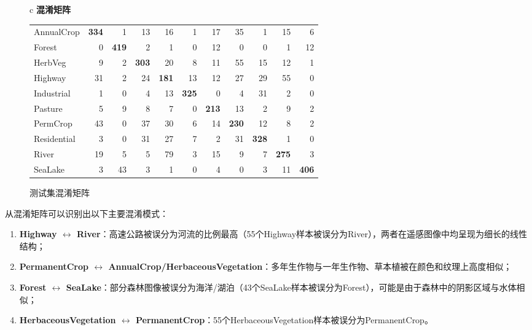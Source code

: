 \documentclass[12pt,a4paper]{article}
\begin{document}
\begin{figure}[H]
\centering
\begin{tabular}{c}
\toprule
\textbf{混淆矩阵} \\
\midrule
\small
\begin{tabular}{l*{10}{r}}
 & \rotatebox{70}{AnnualCrop} & \rotatebox{70}{Forest} & \rotatebox{70}{HerbVeg} & \rotatebox{70}{Highway} & \rotatebox{70}{Industrial} & \rotatebox{70}{Pasture} & \rotatebox{70}{PermCrop} & \rotatebox{70}{Residential} & \rotatebox{70}{River} & \rotatebox{70}{SeaLake} \\
\midrule
AnnualCrop & \textbf{334} & 1 & 13 & 16 & 1 & 17 & 35 & 1 & 15 & 6 \\
Forest & 0 & \textbf{419} & 2 & 1 & 0 & 12 & 0 & 0 & 1 & 12 \\
HerbVeg & 9 & 2 & \textbf{303} & 20 & 8 & 11 & 55 & 15 & 12 & 1 \\
Highway & 31 & 2 & 24 & \textbf{181} & 13 & 12 & 27 & 29 & 55 & 0 \\
Industrial & 1 & 0 & 4 & 13 & \textbf{325} & 0 & 4 & 31 & 2 & 0 \\
Pasture & 5 & 9 & 8 & 7 & 0 & \textbf{213} & 13 & 2 & 9 & 2 \\
PermCrop & 43 & 0 & 37 & 30 & 6 & 14 & \textbf{230} & 12 & 8 & 2 \\
Residential & 3 & 0 & 31 & 27 & 7 & 2 & 31 & \textbf{328} & 1 & 0 \\
River & 19 & 5 & 5 & 79 & 3 & 15 & 9 & 7 & \textbf{275} & 3 \\
SeaLake & 3 & 43 & 3 & 1 & 0 & 4 & 0 & 3 & 11 & \textbf{406} \\
\bottomrule
\end{tabular}
\end{tabular}
\caption{测试集混淆矩阵}
\label{fig:confusion}
\end{figure}

从混淆矩阵可以识别出以下主要混淆模式：

\begin{enumerate}[leftmargin=2em]
    \item \textbf{Highway $\leftrightarrow$ River}：高速公路被误分为河流的比例最高（55个Highway样本被误分为River），两者在遥感图像中均呈现为细长的线性结构；
    \item \textbf{PermanentCrop $\leftrightarrow$ AnnualCrop/HerbaceousVegetation}：多年生作物与一年生作物、草本植被在颜色和纹理上高度相似；
    \item \textbf{Forest $\leftrightarrow$ SeaLake}：部分森林图像被误分为海洋/湖泊（43个SeaLake样本被误分为Forest），可能是由于森林中的阴影区域与水体相似；
    \item \textbf{HerbaceousVegetation $\leftrightarrow$ PermanentCrop}：55个HerbaceousVegetation样本被误分为PermanentCrop。
\end{enumerate}
\end{document}
